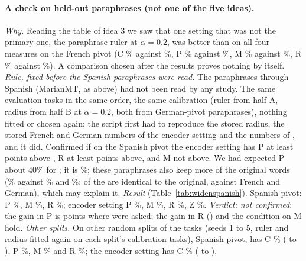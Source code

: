 \paragraph{A check on held-out paraphrases (not one of the five ideas).} \emph{Why.} Reading the table of idea 3 we saw that
one setting that was not the primary one, the paraphrase ruler at $\alpha = 0.2$, was better than \cert{} on all four measures on
the French pivot (\textsf{C} \WidenSpC{}\% against \WidenSpCRule{}\%, \textsf{P} \WidenSpEncFrP{}\% against \WidenRefTfiveFrP{}\%, \textsf{M} \WidenSpEncFrM{}\% against
\WidenRefTfiveFrM{}\%, \textsf{R} \WidenSpEncFrR{}\% against \WidenRefTfiveFrR{}\%). A comparison chosen after the results proves nothing by itself.
\emph{Rule, fixed before the Spanish paraphrases were read.} The paraphrases through Spanish (MarianMT, as above) had not been read by any
study. The same \WidenTasksEval{} evaluation tasks in the same order, the same calibration (ruler from half A, radius from half B at $\alpha = 0.2$,
both from German-pivot paraphrases), nothing fitted or chosen again; the script first had to reproduce the stored radius, the stored French and German
numbers of the encoder setting and the numbers of \cert{}, and it did. Confirmed if on the Spanish pivot the encoder setting has \textsf{P} at least
\WidenSpAskP{} points above \cert{}, \textsf{R} at least \WidenSpAskR{} points above, and \textsf{M} not above. We had expected \textsf{P} about 40\% for \cert{};
it is \WidenRefTfiveEsP{}\%; these paraphrases also keep more of the original words (\WidenSpKept{}\% against \WidenKeptDe{}\% and \WidenKeptFr{}\%; \WidenSpSame{} of the \WidenTasksAll{} are identical to the original,
against \WidenSameFr{} French and \WidenSameDe{} German), which may explain it.
\emph{Result} (Table~\ref{tab:widenspanish}). Spanish pivot: \cert{} \textsf{P} \WidenRefTfiveEsP{}\%, \textsf{M} \WidenRefTfiveEsM{}\%, \textsf{R} \WidenRefTfiveEsR{}\%;
encoder setting \textsf{P} \WidenSpEncEsP{}\%, \textsf{M} \WidenSpEncEsM{}\%, \textsf{R} \WidenSpEncEsR{}\%, \textsf{Z} \WidenSpEncEsZ{}\%. \emph{Verdict: not confirmed}: the
gain in \textsf{P} is \WidenSpGainP{} points where \WidenSpAskP{} were asked; the gain in \textsf{R} (\WidenSpGainR{}) and the condition on \textsf{M} hold.
\emph{Other splits.} On \WidenSplitCount{} other random splits of the tasks (seeds 1 to 5, ruler and radius fitted again on each split's calibration
tasks), Spanish pivot, \cert{} has \textsf{C} \WidenSplitRuleCMean{}\% (\WidenSplitRuleCLow{} to \WidenSplitRuleCHigh{}), \textsf{P} \WidenSplitRulePMean{}\%,
\textsf{M} \WidenSplitRuleMMean{}\% and \textsf{R} \WidenSplitRuleRMean{}\%; the encoder setting has \textsf{C} \WidenSplitEncCMean{}\% (\WidenSplitEncCLow{} to \WidenSplitEncCHigh{}),
